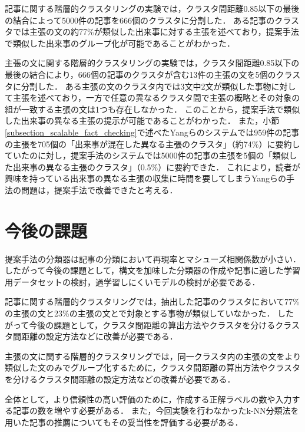 \documentclass[12pt,a4j,dvipdfmx]{jreport}
\begin{document}
記事に関する階層的クラスタリングの実験では，クラスタ間距離0.85以下の最後の結合によって5000件の記事を666個のクラスタに分割した．
ある記事のクラスタでは主張の文の約77\%が類似した出来事に対する主張を述べており，提案手法で類似した出来事のグループ化が可能であることがわかった．

主張の文に関する階層的クラスタリングの実験では，クラスタ間距離0.85以下の最後の結合により，666個の記事のクラスタが含む13件の主張の文を5個のクラスタに分割した．
ある主張の文のクラスタ内では3文中2文が類似した事物に対して主張を述べており，一方で任意の異なるクラスタ間で主張の概略とその対象の組が一致する主張の文は1つも存在しなかった．
このことから，提案手法で類似した出来事の異なる主張の提示が可能であることがわかった．
また，小節\ref{subsection_scalable_fact_checking}で述べたYangらのシステムでは959件の記事の主張を705個の「出来事が混在した異なる主張のクラスタ」（約74\%）に要約していたのに対し，提案手法のシステムでは5000件の記事の主張を5個の「類似した出来事の異なる主張のクラスタ」（0.5\%）に要約できた．
これにより，読者が興味を持っている出来事の異なる主張の収集に時間を要してしまうYangらの手法の問題は，提案手法で改善できたと考える．


\section{今後の課題}
提案手法の分類器は記事の分類において再現率とマシューズ相関係数が小さい．
したがって今後の課題として，構文を加味した分類器の作成や記事に適した学習用データセットの検討，過学習しにくいモデルの検討が必要である．

記事に関する階層的クラスタリングでは，抽出した記事のクラスタにおいて77\%の主張の文と23\%の主張の文とで対象とする事物が類似していなかった．
したがって今後の課題として，クラスタ間距離の算出方法やクラスタを分けるクラスタ間距離の設定方法などに改善が必要である．

主張の文に関する階層的クラスタリングでは，同一クラスタ内の主張の文をより類似した文のみでグループ化するために，クラスタ間距離の算出方法やクラスタを分けるクラスタ間距離の設定方法などの改善が必要である．

全体として，より信頼性の高い評価のために，作成する正解ラベルの数や入力する記事の数を増やす必要がある．
また，今回実験を行わなかったk-NN分類法を用いた記事の推薦についてもその妥当性を評価する必要がある．

\end{document}
